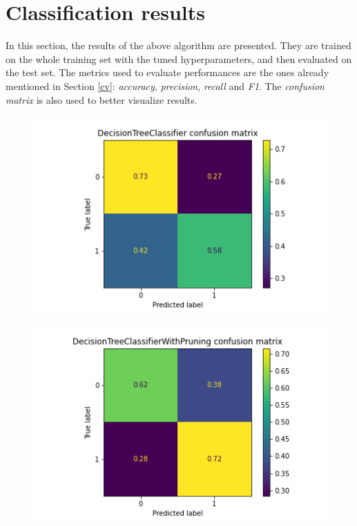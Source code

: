 \documentclass[letterpaper]{article}
\begin{document}
	\section{Classification results}
	In this section, the results of the above algorithm are presented. They are trained on the whole training set with the tuned hyperparameters, and then evaluated on the test set. The metrics used to evaluate performances are the ones already mentioned in Section \ref{cv}: \emph{accuracy}, \emph{precision}, \emph{recall} and \emph{F1}. The \emph{confusion matrix} is also used to better visualize results. \par
	\begin{figure}[!ht]
	\centering
		\begin{minipage}[t]{0.45\textwidth}
			\includegraphics[width=.85\textwidth]{images/confusion_DecisionTreeClassifier.png}
			\setlength{\belowcaptionskip}{-5pt}
			\label{fig:16}
		\end{minipage}
		\begin{minipage}{0.05\textwidth}
			\quad
		\end{minipage}
		\begin{minipage}[t]{0.45\textwidth}
			\includegraphics[width=.85\textwidth]{images/confusion_DecisionTreeClassifierWithPruning.png}

\end{minipage}
\end{figure}
\end{document}
